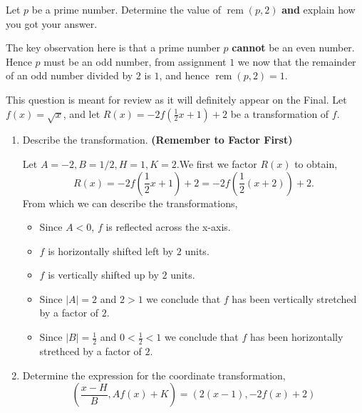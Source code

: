 \documentclass[12pt]{article} %
\begin{document}
  \begin{qstn}
    Let $p$ be a prime number. Determine the value of $ \operatorname{rem}(p,2)$ \textbf{and} explain how you got
    your answer.
    \begin{solution}
      The key observation here is that a prime number  $p$ \textbf{cannot} be an even number. Hence $p$ must be an
      odd number, from assignment $1$ we now that the remainder of an odd number divided by $2$ is $1$, and hence
      $\operatorname{rem}(p,2) = 1$.
    \end{solution}
  \end{qstn}

  \newpage
  
  \begin{qstn}
    This question is meant for review as it will definitely appear on the Final. Let $f(x) = \sqrt{x} $, 
    and let $R(x) = -2f(\frac{1}{2}x + 1) + 2$ be a transformation of $f$. 
    \begin{enumerate}[label=(\alph*)]
      \item Describe the transformation. \textbf{(Remember to Factor First)}
        \begin{solution}
          Let $A = -2, B = 1 / 2, H = 1, K = 2$.We first we factor $R(x)$ to obtain,
          \[
              R(x) = -2f\left(\frac{1}{2}x + 1\right)  + 2 = -2f\left( \frac{1}{2}(x + 2) \right) + 2
          .\] 
          From which we can describe the transformations,
          \begin{itemize}
            \item Since $A < 0$, $f$ is reflected across the x-axis.
            \item $f$ is horizontally shifted left by $2$ units.
            \item $f$ is vertically shifted up by $2$ units.
            \item Since $\left|A\right| = 2$ and $2 > 1$ we conclude that $f$ has been
              vertically stretched by a factor of $2$.
            \item  Since $ \left|B\right| = \frac{1}{2}$ and $0 < \frac{1}{2} < 1$ we conclude 
              that $f$ has been horizontally strethced by a factor  of $2$.
          \end{itemize}
        \end{solution}

      \item Determine the expression for the coordinate transformation,
        \[
          \left( \frac{x- H}{B}, Af(x) + K \right) =
          \left( 2(x - 1), -2f(x) + 2\right) 
        \] 


\end{enumerate}
\end{qstn}
\end{document}

